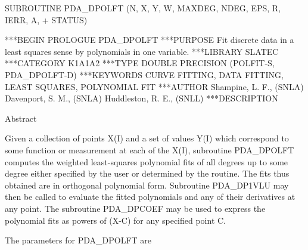 \documentclass[11pt,twoside,nolof]{starlink}
\begin{document}


\begin{terminalv}
      SUBROUTINE PDA_DPOLFT (N, X, Y, W, MAXDEG, NDEG, EPS, R, IERR, A,
     +   STATUS)


***BEGIN PROLOGUE  PDA_DPOLFT
***PURPOSE  Fit discrete data in a least squares sense by polynomials
            in one variable.
***LIBRARY   SLATEC
***CATEGORY  K1A1A2
***TYPE      DOUBLE PRECISION (POLFIT-S, PDA_DPOLFT-D)
***KEYWORDS  CURVE FITTING, DATA FITTING, LEAST SQUARES, POLYNOMIAL FIT
***AUTHOR  Shampine, L. F., (SNLA)
           Davenport, S. M., (SNLA)
           Huddleston, R. E., (SNLL)
***DESCRIPTION

     Abstract

     Given a collection of points X(I) and a set of values Y(I) which
     correspond to some function or measurement at each of the X(I),
     subroutine  PDA_DPOLFT  computes the weighted least-squares polynomial
     fits of all degrees up to some degree either specified by the user
     or determined by the routine.  The fits thus obtained are in
     orthogonal polynomial form.  Subroutine  PDA_DP1VLU  may then be
     called to evaluate the fitted polynomials and any of their
     derivatives at any point.  The subroutine  PDA_DPCOEF  may be used to
     express the polynomial fits as powers of (X-C) for any specified
     point C.

     The parameters for  PDA_DPOLFT  are


\end{terminalv}
\end{document}
